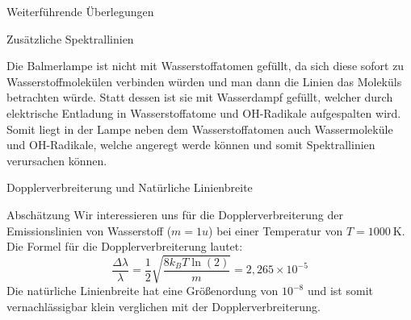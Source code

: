 \documentclass[pdftex, a4paper,11pt, twoside, ngerman]{report}
\begin{document}
  
  
  \begin{chapter}{Weiterführende Überlegungen}
    \label{chp:Weiterfuehrendes}
    
    
    
    \begin{section}{Zusätzliche Spektrallinien}
      \label{chp:Weiterfuehrendes:sec:Spektrallinien}
      
      Die Balmerlampe ist nicht mit Wasserstoffatomen gefüllt, da sich diese sofort zu Wasserstoffmolekülen verbinden würden und man dann die Linien das Moleküls betrachten würde. 
      Statt dessen ist sie mit Wasserdampf gefüllt, welcher durch elektrische Entladung in Wasserstoffatome und OH-Radikale aufgespalten wird. 
      Somit liegt in der Lampe neben dem Wasserstoffatomen auch Wassermoleküle und OH-Radikale, welche angeregt werde können und somit Spektrallinien verursachen können.  
      
    \end{section}
     

    \begin{section}{Dopplerverbreiterung und Natürliche Linienbreite}
      \label{chp:Weiterfuehrendes:sec:Linienbreite}
      
      
      
      \begin{subsection}{Abschätzung}
        \label{chp:Weiterfuehrendes:sec:Linienbreite:subsec:Abschaetzung}
        Wir interessieren uns für die Dopplerverbreiterung der Emissionslinien 
        von Wasserstoff ($m=1u$) bei einer Temperatur von 
        $T=\SI{1000}{\kelvin}$. Die Formel für die Dopplerverbreiterung lautet:
        \[
          \frac{\Delta\lambda}{\lambda} = \frac 12\sqrt{\frac{8k_BT\ln(2)}{m}} 
          = 2,265\times10^{-5}
        \]
        Die natürliche Linienbreite hat eine Größenordung von $10^{-8}$ und 
        ist somit vernachlässigbar klein verglichen mit der 
        Dopplerverbreiterung.
        
      \end{subsection}
      

\end{section}
\end{chapter}
\end{document}
